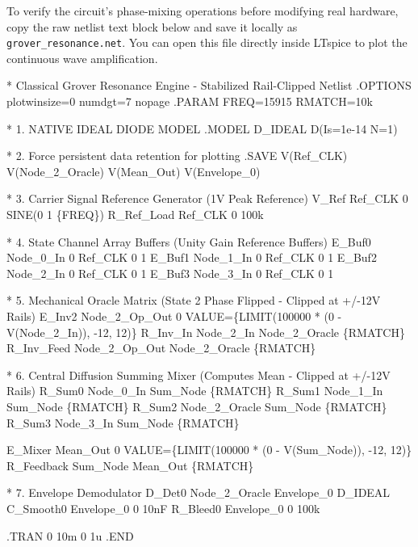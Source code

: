 \documentclass[
]{article}
\newenvironment{Shaded}{}{}
\newcommand{\NormalTok}[1]{#1}
\begin{document}
To verify the circuit's phase-mixing operations before modifying real
hardware, copy the raw netlist text block below and save it locally as
\texttt{grover\_resonance.net}. You can open this file directly inside
LTspice to plot the continuous wave amplification.

\begin{Shaded}
\begin{Highlighting}[]
\NormalTok{* Classical Grover Resonance Engine {-} Stabilized Rail{-}Clipped Netlist}
\NormalTok{.OPTIONS plotwinsize=0 numdgt=7 nopage}
\NormalTok{.PARAM FREQ=15915 RMATCH=10k}

\NormalTok{* 1. NATIVE IDEAL DIODE MODEL }
\NormalTok{.MODEL D\_IDEAL D(Is=1e{-}14 N=1)}

\NormalTok{* 2. Force persistent data retention for plotting}
\NormalTok{.SAVE V(Ref\_CLK) V(Node\_2\_Oracle) V(Mean\_Out) V(Envelope\_0)}

\NormalTok{* 3. Carrier Signal Reference Generator (1V Peak Reference)}
\NormalTok{V\_Ref Ref\_CLK 0 SINE(0 1 \{FREQ\})}
\NormalTok{R\_Ref\_Load Ref\_CLK 0 100k}

\NormalTok{* 4. State Channel Array Buffers (Unity Gain Reference Buffers)}
\NormalTok{E\_Buf0 Node\_0\_In 0 Ref\_CLK 0 1}
\NormalTok{E\_Buf1 Node\_1\_In 0 Ref\_CLK 0 1}
\NormalTok{E\_Buf2 Node\_2\_In 0 Ref\_CLK 0 1}
\NormalTok{E\_Buf3 Node\_3\_In 0 Ref\_CLK 0 1}

\NormalTok{* 5. Mechanical Oracle Matrix (State 2 Phase Flipped {-} Clipped at +/{-}12V Rails)}
\NormalTok{E\_Inv2 Node\_2\_Op\_Out 0 VALUE=\{LIMIT(100000 * (0 {-} V(Node\_2\_In)), {-}12, 12)\}}
\NormalTok{R\_Inv\_In   Node\_2\_In     Node\_2\_Oracle \{RMATCH\}}
\NormalTok{R\_Inv\_Feed Node\_2\_Op\_Out Node\_2\_Oracle \{RMATCH\}}

\NormalTok{* 6. Central Diffusion Summing Mixer (Computes Mean {-} Clipped at +/{-}12V Rails)}
\NormalTok{R\_Sum0 Node\_0\_In Sum\_Node \{RMATCH\}}
\NormalTok{R\_Sum1 Node\_1\_In Sum\_Node \{RMATCH\}}
\NormalTok{R\_Sum2 Node\_2\_Oracle Sum\_Node \{RMATCH\}}
\NormalTok{R\_Sum3 Node\_3\_In Sum\_Node \{RMATCH\}}

\NormalTok{E\_Mixer Mean\_Out 0 VALUE=\{LIMIT(100000 * (0 {-} V(Sum\_Node)), {-}12, 12)\}}
\NormalTok{R\_Feedback Sum\_Node Mean\_Out \{RMATCH\}}

\NormalTok{* 7. Envelope Demodulator}
\NormalTok{D\_Det0 Node\_2\_Oracle Envelope\_0 D\_IDEAL}
\NormalTok{C\_Smooth0 Envelope\_0 0 10nF}
\NormalTok{R\_Bleed0 Envelope\_0 0 100k}

\NormalTok{.TRAN 0 10m 0 1u}
\NormalTok{.END}
\end{Highlighting}
\end{Shaded}
\end{document}
